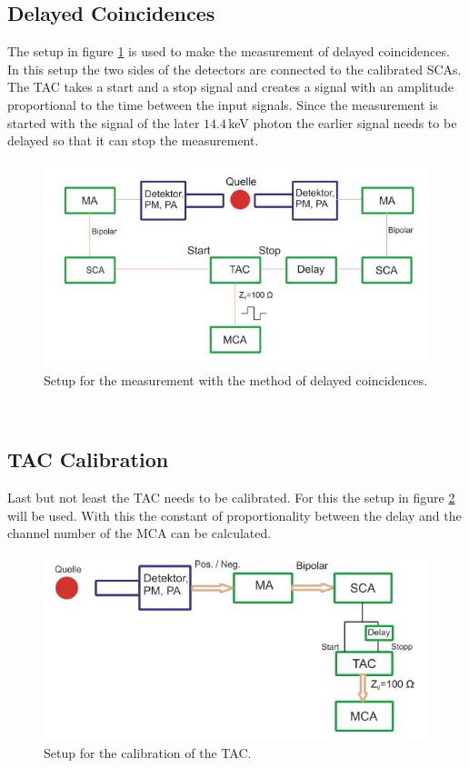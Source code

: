 \documentclass[30pt,a4paper]{article}
\begin{document}
 	\subsection{Delayed Coincidences}
 	The setup in figure \ref{setup_DC} is used to make the measurement of delayed coincidences. In this setup the two sides of the detectors are connected to the calibrated SCAs. The TAC takes a start and a stop signal and creates a signal with an amplitude proportional to the time between the input signals. Since the measurement is started with the signal of the later $14.4$\,keV photon the earlier signal needs to be delayed so that it can stop the measurement.\cite{Anleitung}
 	\begin{figure}[h]
 		\includegraphics{Bilder/Circuit_DC}
 		\centering
 		\caption[Delayed Coincidences Setup]{\small Setup for the measurement with the method of delayed coincidences. \cite{Anleitung}}
 		\label{setup_DC}
 	\end{figure}\\
 	\subsection{TAC Calibration}
 	Last but not least the TAC needs to be calibrated. For this the setup in figure \ref{setup_TC} will be used. With this the constant of proportionality between the delay and the channel number of the MCA can be calculated. \cite{Anleitung}
 	\begin{figure}[h]
 		\includegraphics{Bilder/Circuit_DC_calib}
 		\centering
 		\caption[Time Calibration Setup]{\small Setup for the calibration of the TAC. \cite{Anleitung}}
 		\label{setup_TC}
 	\end{figure}\\
\end{document}
